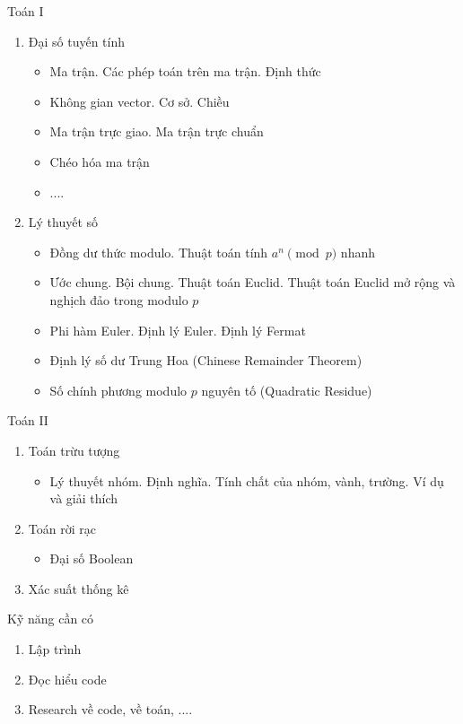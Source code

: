 \begin{frame}{Toán I}
\begin{enumerate}
\item Đại số tuyến tính
\begin{itemize}
    \item Ma trận. Các phép toán trên ma trận. Định thức
    \item Không gian vector. Cơ sở. Chiều
    \item Ma trận trực giao. Ma trận trực chuẩn
    \item Chéo hóa ma trận
    \item ....
\end{itemize}
\item Lý thuyết số
\begin{itemize}
    \item Đồng dư thức modulo. Thuật toán tính $a^n \pmod p$ nhanh
    \item Ước chung. Bội chung. Thuật toán Euclid. Thuật toán Euclid mở rộng và nghịch đảo trong modulo $p$
    \item Phi hàm Euler. Định lý Euler. Định lý Fermat
    \item Định lý số dư Trung Hoa (Chinese Remainder Theorem)
    \item Số chính phương modulo $p$ nguyên tố (Quadratic Residue)
\end{itemize}
\end{enumerate}
\end{frame}
\begin{frame}{Toán II}
\begin{enumerate}
\item Toán trừu tượng
\begin{itemize}
    \item Lý thuyết nhóm. Định nghĩa. Tính chất của nhóm, vành, trường. Ví dụ và giải thích
\end{itemize}
\item Toán rời rạc
\begin{itemize}
    \item Đại số Boolean
\end{itemize}
\item Xác suất thống kê
\end{enumerate}
\end{frame}

\begin{frame}{Kỹ năng cần có}
    \begin{enumerate}
        \item Lập trình
        \item Đọc hiểu code
        \item Research về code, về toán, ....
    \end{enumerate}
\end{frame}